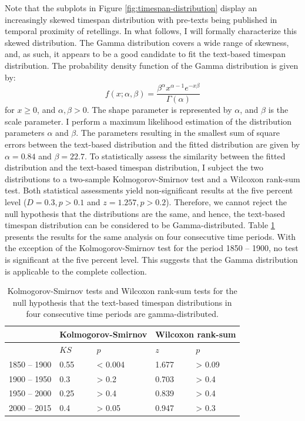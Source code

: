 Note that the subplots in Figure \ref{fig:timespan-distribution} display an increasingly skewed timespan distribution with pre-texts being published in temporal proximity of retellings. In what follows, I will formally characterize this skewed distribution. The Gamma distribution covers a wide range of skewness, and, as such, it appears to be a good candidate to fit the text-based timespan distribution. The probability density function of the Gamma distribution is given by: 
\begin{equation}
f(x; \alpha, \beta) = \frac{\beta^{\alpha} x^{\alpha-1} e^{-x \beta}}{\Gamma(\alpha)}
\end{equation}
for $x \ge 0$, and $\alpha,\beta > 0$. The shape parameter is represented by $\alpha$, and $\beta$ is the scale parameter. I perform a maximum likelihood estimation of the distribution parameters $\alpha$ and $\beta$. The parameters resulting in the smallest sum of square errors between the text-based distribution and the fitted distribution are given by $\alpha=0.84$ and $\beta=22.7$. To statistically assess the similarity between the fitted distribution and the text-based timespan distribution, I subject the two distributions to a two-sample Kolmogorov-Smirnov test and a Wilcoxon rank-sum test. Both statistical assessments yield non-significant results at the five percent level ($D=0.3, p > 0.1$ and $z = 1.257, p > 0.2$). Therefore, we cannot reject the null hypothesis that the distributions are the same, and hence, the text-based timespan distribution can be considered to be Gamma-distributed. Table \ref{tab:gamma-statistics} presents the results for the same analysis on four consecutive time periods. With the exception of the Kolmogorov-Smirnov test for the period 1850 -- 1900, no test is significant at the five percent level. This suggests that the Gamma distribution is applicable to the complete collection.

\begin{table}
\centering
\begin{tabular}{lllll}
\toprule
             & \multicolumn{2}{c}{Kolmogorov-Smirnov} & \multicolumn{2}{c}{Wilcoxon rank-sum} \\ \midrule
             & $KS$ & $p$         & $z$   & $p$         \\ \cmidrule(r){2-5}
1850 -- 1900 & 0.55 & < 0.004 & 1.677 & > 0.09  \\
1900 -- 1950 & 0.3  & > 0.2   & 0.703 & > 0.4   \\
1950 -- 2000 & 0.25 & > 0.4   & 0.839 & > 0.4   \\
2000 -- 2015 & 0.4  & > 0.05  & 0.947 & > 0.3   \\      
\bottomrule
\end{tabular}
\caption{Kolmogorov-Smirnov tests and Wilcoxon rank-sum tests for the null hypothesis that the text-based timespan distributions in four consecutive time periods are gamma-distributed.}
\label{tab:gamma-statistics} 
\end{table}

